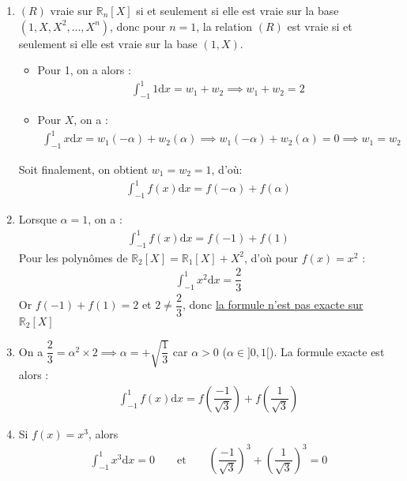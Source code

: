 \documentclass[12pt,a4paper]{article}
\begin{document}
\begin{enumerate}
\item $(R)$ vraie sur $\mathbb{R}_n[X]$ si et seulement si elle est vraie sur la base $(1,X,X^2, ..., X^n)$, donc pour $n=1$, la relation $(R)$ est vraie si et seulement si elle est vraie sur la base $(1,X)$. 
\begin{itemize}
\item Pour 1, on a alors : 
\begin{align*}
\int^1_{-1}1 \text{d}x = w_1 + w_2 \implies w_1 + w_2 = 2
\end{align*}
\item Pour $X$, on a : 
\begin{align*}
\int^1_{-1} x \text{d}x = w_1(-\alpha) + w_2(\alpha) \implies w_1(-\alpha) + w_2(\alpha) = 0 \implies w_1 = w_2
\end{align*}
\end{itemize}

Soit finalement, on obtient $w_1 = w_2 = 1$, d'où: 
\begin{align*}
  \int^1_{-1} f(x) \text{d}x = f(-\alpha) + f(\alpha)
\end{align*}

\item Lorsque $\alpha = 1$, on a : 
\begin{align*}
\int^1_{-1} f(x) \text{d}x = f(-1) + f(1)
\end{align*}
Pour les polynômes de $\mathbb{R}_2[X] = \mathbb{R}_1[X] + X^2$, d'où pour $f(x)=x^2$ : 
\begin{align*}
\int^1_{-1} x^2 \text{d}x = \dfrac{2}{3}
\end{align*}
Or $f(-1) + f(1) = 2$ et $2 \neq  \dfrac{2}{3}$, donc \underline{la formule n'est pas exacte sur $\mathbb{R}_2[X]$}


\item On a $\dfrac{2}{3} = \alpha^2 \times 2 \implies \alpha = + \sqrt{\dfrac{1}{3}}$ car $\alpha > 0$ ($\alpha \in ]0,1[$). La formule exacte est alors : 
\begin{align*}
\int^1_{-1} f(x) \text{d}x = f\left(\dfrac{-1}{\sqrt{3}} \right) + f\left(\dfrac{1}{\sqrt{3}}\right)
\end{align*}

\item Si $f(x)=x^3$, alors 
\begin{align*}
\int^1_{-1} x^3 \text{d}x = 0 \qquad \text{et} \qquad \left( \dfrac{-1}{\sqrt{3}}\right)^3 + \left( \dfrac{1}{\sqrt{3}}\right)^3 = 0
\end{align*}


\end{enumerate}
\end{document}
